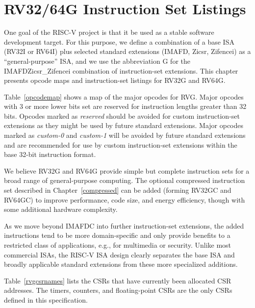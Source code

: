 \chapter{RV32/64G Instruction Set Listings}

One goal of the RISC-V project is that it be used as a stable software
development target.  For this purpose, we define a combination of a
base ISA (RV32I or RV64I) plus selected standard extensions (IMAFD, Zicsr, Zifencei) as
a ``general-purpose'' ISA, and we use the abbreviation G for the IMAFDZicsr\_Zifencei
combination of instruction-set extensions.    This chapter presents
opcode maps and instruction-set listings for RV32G and RV64G.



Table~\ref{opcodemap} shows a map of the major opcodes for RVG.  Major
opcodes with 3 or more lower bits set are reserved for instruction
lengths greater than 32 bits.  Opcodes marked as {\em reserved} should
be avoided for custom instruction-set extensions as they might be used
by future standard extensions.  Major opcodes marked as {\em custom-0}
and {\em custom-1} will be avoided by future standard extensions and
are recommended for use by custom instruction-set extensions within
the base 32-bit instruction format.

We believe RV32G and RV64G provide simple but complete instruction
sets for a broad range of general-purpose computing.  The optional
compressed instruction set described in Chapter~\ref{compressed} can
be added (forming RV32GC and RV64GC) to improve performance, code
size, and energy efficiency, though with some additional hardware
complexity.

As we move beyond IMAFDC into further instruction-set extensions, the
added instructions tend to be more domain-specific and only provide
benefits to a restricted class of applications, e.g., for multimedia
or security.  Unlike most commercial ISAs, the RISC-V ISA design
clearly separates the base ISA and broadly applicable standard
extensions from these more specialized additions.



\FloatBarrier
Table~\ref{rvgcsrnames} lists the CSRs that have
currently been allocated CSR addresses.  The timers, counters, and
floating-point CSRs are the only CSRs defined in this specification.


